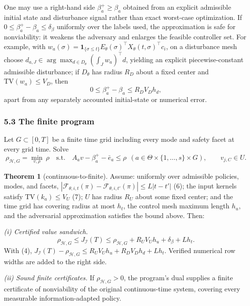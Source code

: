 \documentclass[10pt,twocolumn]{article}
\theoremstyle{definition}
\newtheorem{theorem}{Theorem}
\begin{document}
One may use a right-hand side \(\beta_a^{+} \ge \beta_a\) obtained from an
explicit admissible initial state and disturbance signal rather than exact
worst-case optimization. If \(0 \le \beta_a^{+} - \beta_a \le \delta_\beta\)
uniformly over the labels used, the approximation is safe for nonviability:
it weakens the adversary and enlarges the feasible controller set. For
example, with \(w_a(\sigma) = \mathbf{1}_{\{\sigma \le t\}}
E_\theta(\sigma)^\top X_\theta(t,\sigma)^\top c_i\), on a disturbance mesh
choose \(d_{a,J} \in \arg\max_{d \in D_\theta} (\int_J w_a)^{\top} d\),
yielding an explicit piecewise-constant admissible disturbance; if
\(D_\theta\) has radius \(R_D\) about a fixed center and
\(\mathrm{TV}(w_a) \le V_D\), then
\[
0 \le \beta_a^{+} - \beta_a \le R_D V_D h_d,
\tag{4}
\]
apart from any separately accounted initial-state or numerical error.

\subsubsection{5.3 The finite program}\label{finlp}

Let \(G \subset [0,T]\) be a finite time grid including every mode and safety
facet at every grid time. Solve
\[
\rho_{\mathcal{H},G} = \min_{v, \rho}\ \rho
\quad \text{s.t.} \quad
A_a v - \beta_a^{+} - \bar{e}_a \le \rho \ \ (a \in \Theta \times \{1,\dots,s\} \times G),
\qquad v_{j,C} \in U.
\tag{5}
\]

\begin{theorem}[continuous-to-finite]\label{thm:bridge}
Assume: uniformly over admissible policies, modes, and facets,
\(|\mathcal{F}_{\theta,i,t}(\pi) - \mathcal{F}_{\theta,i,t'}(\pi)| \le
L|t - t'|\) (6); the input kernels satisfy \(\mathrm{TV}(k_a) \le V_U\) (7);
\(U\) has radius \(R_U\) about some fixed center; and the time grid has
covering radius at most \(h_t\), the control mesh maximum length \(h_u\), and
the adversarial approximation satisfies the bound above. Then:
\end{theorem}

\emph{(i) Certified value sandwich.}
\[
\rho_{\mathcal{H},G} \le J_{\mathcal{I}}(T) \le \rho_{\mathcal{H},G}
+ R_U V_U h_u + \delta_\beta + L h_t.
\tag{8}
\]
With (4), \(J_{\mathcal{I}}(T) - \rho_{\mathcal{H},G} \le R_U V_U h_u + R_D
V_D h_d + L h_t\). Verified numerical row widths are added to the right side.

\emph{(ii) Sound finite certificates.} If \(\rho_{\mathcal{H},G} > 0\), the
program's dual supplies a finite certificate of nonviability of the original
continuous-time system, covering every measurable information-adapted policy.
\end{document}
